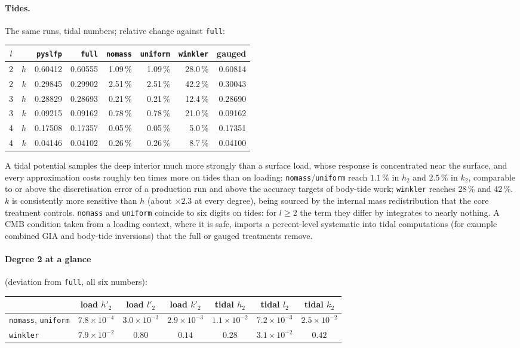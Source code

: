 \documentclass[11pt]{article}
\numberwithin{equation}{section}
\newcommand{\code}[1]{\texttt{#1}}
\begin{document}
\paragraph{Tides.} The same runs, tidal numbers; relative change against
\code{full}:
\begin{center}
\small
\begin{tabular}{@{}cc rrrrrr@{}}
\toprule
$l$ & & \code{pyslfp} & \code{full} & \code{nomass} & \code{uniform} & \code{winkler} & gauged \\
\midrule
2 & $h$ & 0.60412 & 0.60555 & 1.09\,\% & 1.09\,\% & 28.0\,\% & 0.60814 \\
2 & $k$ & 0.29845 & 0.29902 & 2.51\,\% & 2.51\,\% & 42.2\,\% & 0.30043 \\
3 & $h$ & 0.28829 & 0.28693 & 0.21\,\% & 0.21\,\% & 12.4\,\% & 0.28690 \\
3 & $k$ & 0.09215 & 0.09162 & 0.78\,\% & 0.78\,\% & 21.0\,\% & 0.09162 \\
4 & $h$ & 0.17508 & 0.17357 & 0.05\,\% & 0.05\,\% & 5.0\,\% & 0.17351 \\
4 & $k$ & 0.04146 & 0.04102 & 0.26\,\% & 0.26\,\% & 8.7\,\% & 0.04100 \\
\bottomrule
\end{tabular}
\end{center}
A tidal potential samples the deep interior much more strongly than a
surface load, whose response is concentrated near the surface, and every
approximation costs roughly ten times more on tides than on loading:
\code{nomass}/\code{uniform} reach $1.1\,\%$ in $h_2$ and $2.5\,\%$ in $k_2$,
comparable to or above the discretisation error of a production run and
above the accuracy targets of body-tide work; \code{winkler} reaches 28\,\%
and 42\,\%. $k$ is consistently more sensitive than $h$ (about $\times2.3$
at every degree), being sourced by the internal mass redistribution that
the core treatment controls. \code{nomass} and \code{uniform} coincide to
six digits on tides: for $l\ge2$ the term they differ by integrates to
nearly nothing. A CMB condition taken from a loading context, where it is
safe, imports a percent-level systematic into tidal computations (for
example combined GIA and body-tide inversions) that the full or gauged
treatments remove.

\paragraph{Degree 2 at a glance} (deviation from \code{full}, all six
numbers):
\begin{center}
\small
\begin{tabular}{@{}lcccccc@{}}
\toprule
 & load $h'_2$ & load $l'_2$ & load $k'_2$ & tidal $h_2$ & tidal $l_2$ & tidal $k_2$ \\
\midrule
\code{nomass}, \code{uniform} & $7.8\times10^{-4}$ & $3.0\times10^{-3}$ & $2.9\times10^{-3}$ & $1.1\times10^{-2}$ & $7.2\times10^{-3}$ & $2.5\times10^{-2}$ \\
\code{winkler} & $7.9\times10^{-2}$ & $0.80$ & $0.14$ & $0.28$ & $3.1\times10^{-2}$ & $0.42$ \\
\bottomrule
\end{tabular}
\end{center}
\end{document}
